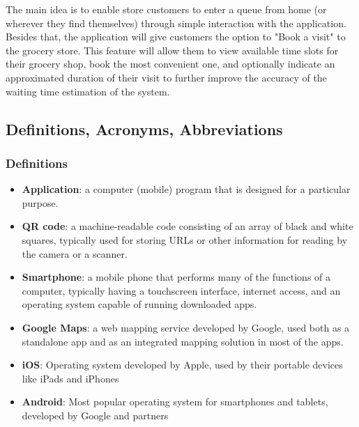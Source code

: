 The main idea is to enable store customers to enter a queue from home (or wherever they find themselves) through simple interaction with the application. Besides that, the application will give customers the option to "Book a visit" to the grocery store. This feature will allow them to view available time slots for their grocery shop, book the most convenient one, and optionally indicate an approximated duration of their visit to further improve the accuracy of the waiting time estimation of the system.  

\newpage

\subsection{Definitions, Acronyms, Abbreviations}
\subsubsection{Definitions}
\begin{itemize} 
	\item \textbf{Application}: a computer (mobile) program that is designed for a particular purpose. 
	\item \textbf{QR code}: a machine-readable code consisting of an array of black and white squares, typically used for storing URLs or other information for reading by the camera or a scanner. 
	\item \textbf{Smartphone}: a mobile phone that performs many of the functions of a computer, typically having a touchscreen interface, internet access, and an operating system capable of running downloaded apps. 
	\item \textbf{Google Maps}: a web mapping service developed by Google, used both as a standalone app and as an integrated mapping solution in most of the apps.
	\item \textbf{iOS}: Operating system developed by Apple, used by their portable devices like iPads and iPhones
	\item \textbf{Android}: Most popular operating system for smartphones and tablets, developed by Google and partners
\end{itemize}
